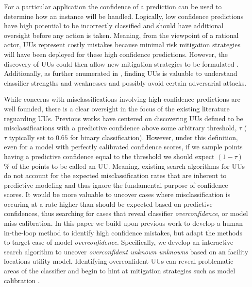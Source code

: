 \documentclass[letterpaper]{article} %
\begin{document}
For a particular application the confidence of a prediction can be used to determine how an instance will be handled.  Logically, low confidence predictions have high potential to be incorrectly classified and should have additional oversight before any action is taken.  Meaning, from the viewpoint of a rational actor, UUs represent costly mistakes because minimal risk mitigation strategies will have been deployed for these high confidence predictions.  However, the discovery of UUs could then allow new mitigation strategies to be formulated \citep{Nushi2016a}. Additionally, as further enumerated in \citet{Bansal2018}, finding UUs is valuable to understand classifier strengths and weaknesses and possibly avoid certain adversarial attacks.

While concerns with misclassifications involving high confidence predictions are well founded, there is a clear oversight in the focus of the existing literature reguarding UUs. Previous works have centered on discovering UUs defined to be misclassifications with a predictive confidence above some arbitrary threshold, $\tau$ ($\tau$ typically set to $0.65$ for binary classification). However, under this definition, even for a model with perfectly calibrated confidence scores, if we sample points having a predictive confidence equal to the threshold we should expect $(1-\tau)$\% of the points to be called an UU. Meaning, existing search algorithms for UUs do not account for the expected misclassification rates that are inherent to predictive modeling and thus ignore the fundamental purpose of confidence scores.  It would be more valuable to uncover cases where misclassification is occuring at a rate higher than should be expected based on predictive confidences, thus searching for cases that reveal classifier \textit{overconfidence}, or model miss-calibration. In this paper we build upon previous work to develop a human-in-the-loop method to identify high confidence mistakes, but adapt the methods to target case of model \textit{overconfidence}. Specifically, we develop an interactive search algorithm to uncover \textit{overconfident unknown unknowns} based on an facility locations utility model. Identifying overconfident UUs can reveal problematic areas of the classifier and begin to hint at mitigation strategies such as model calibration \citep{bella2010calibration}.  
\end{document}

